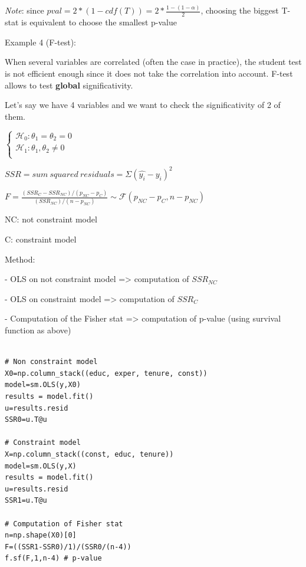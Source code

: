 \textit{Note}: since $pval = 2*(1-cdf(T)) = 2*\frac{1-(1-\alpha)}{2}$, choosing the biggest T-stat is equivalent to choose the smallest p-value

\vspace{5mm}

Example 4 (F-test):

\vspace{5mm}

When several variables are correlated (often the case in practice), the student test is not efficient enough since it does not take the correlation into account. F-test allows to test \textbf{global} significativity.

Let's say we have 4 variables and we want to check the significativity of 2 of them.

\vspace{5mm}

$
\left\{
    \begin{array}{ll}
        \mathcal{H}_0: \theta_1 = \theta_2 = 0\\
        \mathcal{H}_1: \theta_1, \theta_2 \neq 0 \\
    \end{array}
\right.
$

\vspace{5mm}

$SSR = sum~squared~residuals = \Sigma (\widehat{y_i} - y_i)^2$

\vspace{5mm}

$F = \frac{(SSR_C - SSR_{NC})/(p_{NC} - p_C)}{(SSR_{NC})/(n-p_{NC})} \sim \mathcal{F}(p_{NC} - p_C, n-p_{NC})$

\vspace{5mm}

NC: not constraint model

C: constraint model

\vspace{5mm}

Method:

- OLS on not constraint model => computation of $SSR_{NC}$

- OLS  on constraint model => computation of $SSR_{C}$

- Computation of the Fisher stat => computation of p-value (using survival function as above)

\lstset{language=Python}
\lstset{frame=lines}
\lstset{basicstyle=\footnotesize}
\begin{lstlisting}

# Non constraint model
X0=np.column_stack((educ, exper, tenure, const))
model=sm.OLS(y,X0)
results = model.fit()
u=results.resid
SSR0=u.T@u

# Constraint model
X=np.column_stack((const, educ, tenure))
model=sm.OLS(y,X)
results = model.fit()
u=results.resid
SSR1=u.T@u

# Computation of Fisher stat
n=np.shape(X0)[0]
F=((SSR1-SSR0)/1)/(SSR0/(n-4))
f.sf(F,1,n-4) # p-value

\end{lstlisting}


\vspace{5mm}
